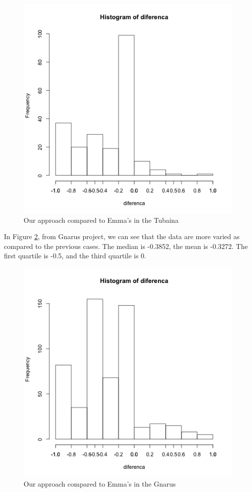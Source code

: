 \documentclass{sig-alternate}
\begin{document}
\begin{figure}[h!H]
  \centering
  \includegraphics[scale=0.28]{../stats/tubaina-histograma-gelato.png}
  \caption{Our approach compared to Emma's in the Tubaina}
  \label{fig:tubaina}
\end{figure}


In Figure \ref{fig:gnarus}, from Gnarus project, we can see that the data are more varied as 
compared to the previous cases. The median is -0.3852, the mean is -0.3272. The first quartile
is -0.5, and the third quartile is 0.

\begin{figure}[h!H]
  \centering
  \includegraphics[scale=0.28]{../stats/gnarus-histograma-gelato.png}
  \caption{Our approach compared to Emma's in the Gnarus}
  \label{fig:gnarus}
\end{figure}
\end{document}
